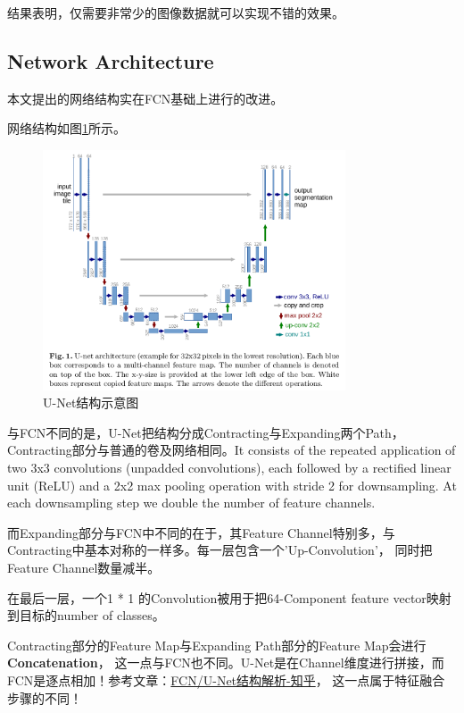 结果表明，仅需要非常少的图像数据就可以实现不错的效果。

\subsection{Network Architecture}

本文提出的网络结构实在FCN基础上进行的改进。

网络结构如图\ref{U-Net0}所示。

\begin{figure}[!hbtp]
\centering
\includegraphics[width=0.8\textwidth]{SemanticSLAM/U-Net0.png}
\caption{U-Net结构示意图}
\label{U-Net0}
\end{figure}

与FCN不同的是，U-Net把结构分成Contracting与Expanding两个Path， Contracting部分与普通的卷及网络相同。It consists of the repeated
application of two 3x3 convolutions (unpadded convolutions), each followed by
a rectified linear unit (ReLU) and a 2x2 max pooling operation with stride 2
for downsampling. At each downsampling step we double the number of feature
channels.

而Expanding部分与FCN中不同的在于，其Feature Channel特别多，与Contracting中基本对称的一样多。每一层包含一个'Up-Convolution'， 同时把Feature Channel数量减半。

在最后一层，一个1 * 1 的Convolution被用于把64-Component feature vector映射到目标的number of classes。

Contracting部分的Feature Map与Expanding Path部分的Feature Map会进行\textbf{Concatenation}， 这一点与FCN也不同。U-Net是在Channel维度进行拼接，而FCN是逐点相加！参考文章：\href{https://zhuanlan.zhihu.com/p/31428783}{FCN/U-Net结构解析-知乎}， 这一点属于特征融合步骤的不同！

